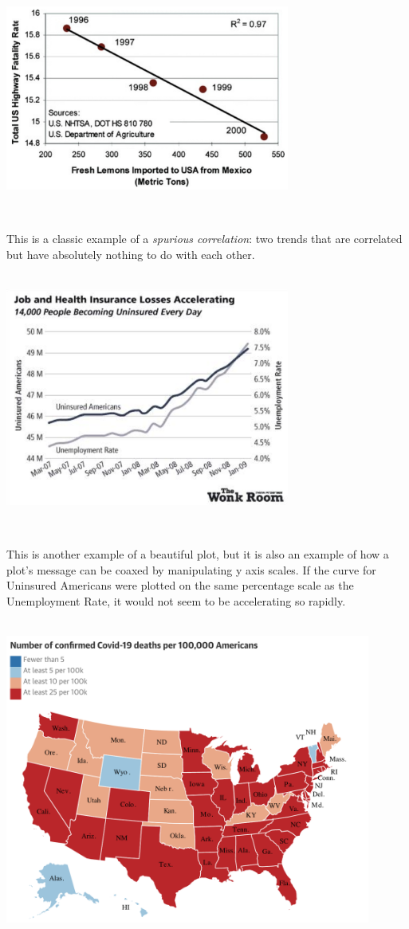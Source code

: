\documentclass[
]{book}
\begin{document}
\includegraphics[width=0.7\textwidth,height=\textheight]{img/vis20.png}

~

This is a classic example of a \emph{spurious correlation}: two trends that are correlated but have absolutely nothing to do with each other.

~\\

\includegraphics[width=0.7\textwidth,height=\textheight]{img/vis21.png}

~

This is another example of a beautiful plot, but it is also an example of how a plot's message can be coaxed by manipulating y axis scales. If the curve for Uninsured Americans were plotted on the same percentage scale as the Unemployment Rate, it would not seem to be accelerating so rapidly.

~\\

\includegraphics[width=0.9\textwidth,height=\textheight]{img/visb.png}
\end{document}
